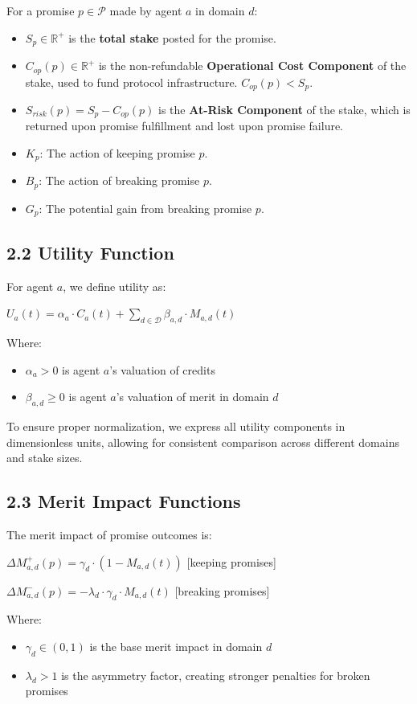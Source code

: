 \documentclass[11pt]{article}
\begin{document}
For a promise \(p \in \mathcal{P}\) made by agent \(a\) in domain \(d\):
\begin{itemize}
\item \(S_p \in \mathbb{R}^+\) is the \textbf{total stake} posted for the promise.
\item \(C_{op}(p) \in \mathbb{R}^+\) is the non-refundable \textbf{Operational Cost Component} of the stake, used to fund protocol infrastructure. \(C_{op}(p) < S_p\).
\item \(S_{risk}(p) = S_p - C_{op}(p)\) is the \textbf{At-Risk Component} of the stake, which is returned upon promise fulfillment and lost upon promise failure.
\item \(K_p\): The action of keeping promise \(p\).
\item \(B_p\): The action of breaking promise \(p\).
\item \(G_p\): The potential gain from breaking promise \(p\).
\end{itemize}
\subsection{2.2 Utility Function}
\label{sec:org6239ceb}
For agent \(a\), we define utility as:

\(U_a(t) = \alpha_a \cdot C_a(t) + \sum_{d \in \mathcal{D}} \beta_{a,d} \cdot M_{a,d}(t)\)

Where:
\begin{itemize}
\item \(\alpha_a > 0\) is agent \(a\)'s valuation of credits
\item \(\beta_{a,d} \geq 0\) is agent \(a\)'s valuation of merit in domain \(d\)
\end{itemize}

To ensure proper normalization, we express all utility components in dimensionless units, allowing for consistent comparison across different domains and stake sizes.
\subsection{2.3 Merit Impact Functions}
\label{sec:orga77dcc7}
The merit impact of promise outcomes is:

\(\Delta M_{a,d}^+(p) = \gamma_d \cdot (1 - M_{a,d}(t))\) {[}keeping promises]

\(\Delta M_{a,d}^-(p) = -\lambda_d \cdot \gamma_d \cdot M_{a,d}(t)\) {[}breaking promises]

Where:
\begin{itemize}
\item \(\gamma_d \in (0,1)\) is the base merit impact in domain \(d\)
\item \(\lambda_d > 1\) is the asymmetry factor, creating stronger penalties for broken promises
\end{itemize}
\end{document}
